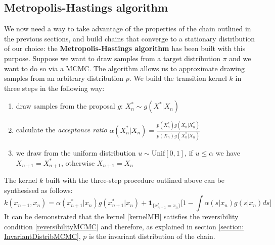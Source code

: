 \documentclass[12pt,mythesisstyle]{report}
\begin{document}
\subsection{Metropolis-Hastings algorithm}\label{section:MetropolisHastings}
We now need a way to take advantage of the properties of the chain outlined in the previous sections, and build chains that converge to a stationary distribution of our choice: the \textbf{Metropolis-Hastings algorithm} \cite{Metropolis} \cite{Hastings} has been built with this purpose. Suppose we want to draw samples from a target distribution $\pi$ and we want to do so via a MCMC. The algorithm allows us to approximate drawing samples from an arbitrary distribution $p$. We build the transition kernel $k$ in three steps in the following way:
\begin{enumerate}
	\item draw samples from the proposal $g$: $X^*_n \sim g(X^*|X_n)$
	\item calculate the \textit{acceptance ratio}  $\alpha(X^*_n|X_n)=\frac{p(X^*_n)g(X_n|X^*_n)}{p(X_n)g(X^*_n|X_n)}$
	\item we draw from the uniform distribution $u \sim \text{Unif}[0,1]$, if $u\leq\alpha$ we have $X_{n+1}=X^*_{n+1}$, otherwise $X_{n+1}=X_n$
\end{enumerate}
The kernel $k$ built with the three-step procedure outlined above can be synthesised as follows:
\begin{equation}\label{kernelMH}
k(x_{n+1}, x_{n})=\alpha(x^*_{n+1} | x_n)g(x^*_{n+1} | x_n)+\mathbf{1}_{\bigl\{x^*_{n+1}=x_n\bigr\}}\bigg[1 - \int \alpha (s | x_n)g(s|x_n)ds\bigg]
\end{equation}
It can be demonstrated \cite{mcmcnotes} \cite {RobertCasella} that the kernel \eqref{kernelMH} satisfies the reversibility condition \eqref{reversibilityMCMC} and therefore, as explained in section \ref{section: InvariantDistribMCMC}, $p$ is the invariant distribution of the chain.
\end{document}
